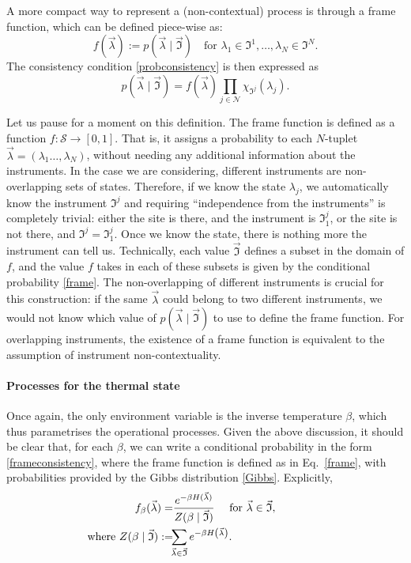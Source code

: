 \documentclass[a4paper,onecolumn,11pt,accepted=2018-05-04]{quantumarticle}
\begin{document}
A more compact way to represent a (non-contextual) process is through a frame function, which can be defined piece-wise as:
\begin{equation}
f(\vec{\lambda}) := 
p(\vec{\lambda}\mid \vec{\mathfrak{I}}) \quad \textrm{for } \lambda_1\in\mathfrak{I}^1, \dots, \lambda_N\in\mathfrak{I}^N.
\label{frame}
\end{equation}
The consistency condition \eqref{probconsistency} is then expressed as
\begin{equation}
p(\vec{\lambda}\mid \vec{\mathfrak{I}}) = f(\vec{\lambda}) \prod_{j\in \mathcal{N}}\chi_{\mathfrak{I}^j}(\lambda_j).
\label{frameconsistency}
\end{equation}

Let us pause for a moment on this definition. The frame function is defined as a function $f:\mathcal{S}\rightarrow [0,1]$. That is, it assigns a probability to each $N$-tuplet $\vec{\lambda}=\left(\lambda_1\dots,\lambda_N\right)$, without needing any additional information about the instruments. In the case we are considering, different instruments are non-overlapping sets of states. Therefore, if we know the state $\lambda_j$, we automatically know the instrument $\mathfrak{I}^j$ and requiring ``independence from the instruments'' is completely trivial: either the site is there, and the instrument is $\mathfrak{I}^j_1$, or the site is not there, and $\mathfrak{I}^j = \mathfrak{I}^j_1$. Once we know the state, there is nothing more the instrument can tell us. Technically, each value $\vec{\mathfrak{I}}$ defines a subset in the domain of $f$, and the value $f$ takes in each of these subsets is given by the conditional probability \eqref{frame}. The non-overlapping of different instruments is crucial for this construction: if the same $\vec{\lambda}$ could belong to two different instruments, we would not know which value of $p(\vec{\lambda}\mid \vec{\mathfrak{I}})$ to use to define the frame function. For overlapping instruments, the existence of a frame function is equivalent to the assumption of instrument non-contextuality.

\paragraph*{Processes for the thermal state}
Once again, the only environment variable is the inverse temperature $\beta$, which thus parametrises the operational processes. Given the above discussion, it should be clear that, for each $\beta$, we can write a conditional probability in the form \eqref{frameconsistency}, where the frame function is defined as in Eq.~\eqref{frame}, with probabilities provided by the Gibbs distribution \eqref{Gibbs}. Explicitly,
\begin{align} \label{framethermal}
f_{\beta}(\vec{\lambda}) =& 
\frac{e^{-\beta H(\vec{\lambda})}}{Z(\beta\mid \vec{\mathfrak{I}})}\quad \textrm{ for } \vec{\lambda}\in \vec{\mathfrak{I}},\\ \textrm{\hspace{-60pt} where }
Z(\beta\mid \vec{\mathfrak{I}}):=&\!\!\sum_{\vec{\lambda}\in\vec{\mathfrak{I}}} e^{-\beta H\left(\vec{\lambda}\right)}.
\end{align}
\end{document}
